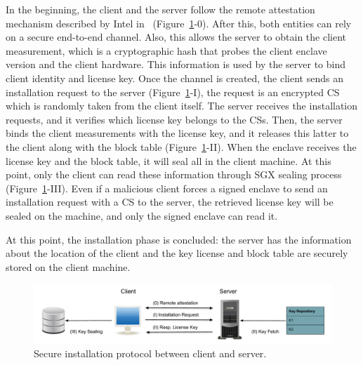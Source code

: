 In the beginning, the client and the server follow the remote attestation 
mechanism described by
Intel in~\cite{sgxremoteatt} (Figure~\ref{fig:installation}-0).
After this, both entities can rely on a secure end-to-end channel.
Also, this allows the server to obtain the client measurement, which is a 
cryptographic hash
that probes the client enclave version and the client hardware.
This information is used by the server to bind client identity and license key.
Once the channel is created, the client sends an installation request to the 
server
(Figure~\ref{fig:installation}-I), the request is an encrypted CS
which is randomly taken from the client itself.
The server receives the installation requests, and it verifies which license 
key belongs
to the CSs.
Then, the server binds the client measurements with the license key, and it 
releases this
latter to the client along with the block table 
(Figure~\ref{fig:installation}-II).
When the enclave receives the license key and the block table, it will seal all 
in the client machine.
At this point, only the client can read these information through SGX sealing 
process (Figure~\ref{fig:installation}-III).
Even if a malicious client forces a signed enclave to send an installation 
request
with a CS to the server, 
the retrieved license key will be sealed on the machine, and only the signed 
enclave can read it.

At this point, the installation phase is concluded: the server has the 
information about
the location of the client and the key license and block table are securely 
stored 
on the client machine.

\begin{figure}[t]
	\centering
	\includegraphics[width=0.9\linewidth]{fig_c3/installation.pdf}
	\caption{Secure installation protocol between client and server.}
	\label{fig:installation}
\end{figure}


